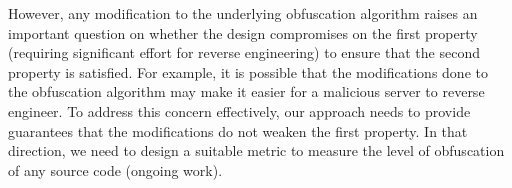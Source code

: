 \documentclass[conference]{IEEEtran}
\begin{document}
However, any modification to the underlying obfuscation algorithm raises an important question on whether 
the design compromises on the first property (requiring significant effort for reverse engineering) 
to ensure that the second property is satisfied. For example, it is possible that the modifications 
done to the obfuscation algorithm may make it easier for a malicious server to reverse engineer. 
To address this concern effectively, our approach needs to provide guarantees that the modifications 
do not weaken the first property. In that direction, we need to design a suitable metric to 
measure the level of obfuscation of any source code (ongoing work). 


\end{document}
